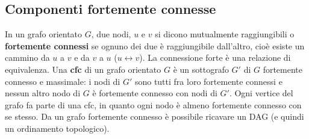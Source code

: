 \documentclass[11pt]{article}
\theoremstyle{proprietà}
\begin{document}
\subsection{Componenti fortemente connesse}
In un grafo orientato $G$, due nodi, $u$ e $v$ si dicono mutualmente raggiungibili o \textbf{fortemente connessi} se 
ognuno dei due è raggiungibile dall'altro, cioè esiste un cammino da $u$ a $v$ e da $v$ a $u$ ($u \leftrightarrow v$).
La connessione forte è una relazione di equivalenza.
Una \textbf{cfc} di un grafo orientato $G$ è un sottografo $G'$ di $G$ fortemente connesso e massimale: i nodi di $G'$ sono 
tutti fra loro fortemente connessi e nessun altro nodo di $G$ è fortemente connesso con nodi di $G'$. Ogni vertice del grafo 
fa parte di una cfc, in quanto ogni nodo è almeno fortemente connesso con se stesso. Da un grafo fortemente connesso è possibile 
ricavare un DAG (e quindi un ordinamento topologico). 
\end{document}
